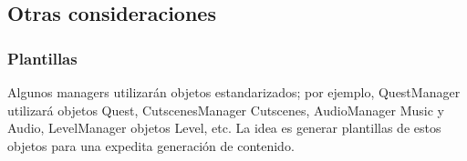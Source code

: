 \subsection{Otras consideraciones}\label{modelado:managers-otras-consideraciones}
\subsubsection{Plantillas}
Algunos managers utilizarán objetos estandarizados; por ejemplo, QuestManager utilizará objetos Quest, CutscenesManager Cutscenes, AudioManager Music y Audio, LevelManager objetos Level, etc. La idea es generar plantillas de estos objetos para una expedita generación de contenido.